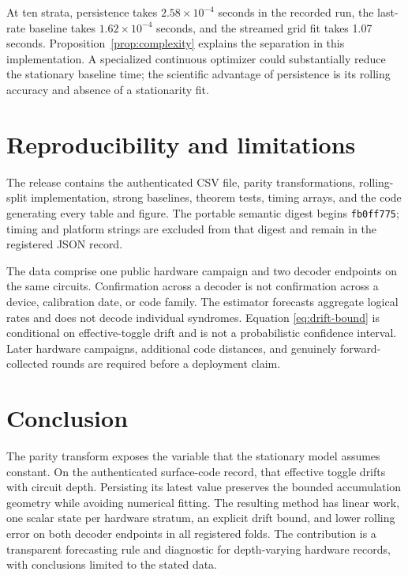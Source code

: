 \documentclass[10pt,letterpaper,twoside]{article}
\begin{document}
At ten strata, persistence takes $2.58\times10^{-4}$ seconds in the recorded
run, the last-rate baseline takes $1.62\times10^{-4}$ seconds, and the streamed
grid fit takes 1.07 seconds. Proposition~\ref{prop:complexity} explains the
separation in this implementation. A specialized continuous optimizer could
substantially reduce the stationary baseline time; the scientific advantage of
persistence is its rolling accuracy and absence of a stationarity fit.

\section{Reproducibility and limitations}

The release contains the authenticated CSV file, parity transformations,
rolling-split implementation, strong baselines, theorem tests, timing arrays,
and the code generating every table and figure. The portable semantic digest
begins \texttt{fb0ff775}; timing and platform strings are excluded from that
digest and remain in the registered JSON record.

The data comprise one public hardware campaign and two decoder endpoints on the
same circuits. Confirmation across a decoder is not confirmation across a
device, calibration date, or code family. The estimator forecasts aggregate
logical rates and does not decode individual syndromes. Equation
\eqref{eq:drift-bound} is conditional on effective-toggle drift and is not a
probabilistic confidence interval. Later hardware campaigns, additional code
distances, and genuinely forward-collected rounds are required before a
deployment claim.

\section{Conclusion}

The parity transform exposes the variable that the stationary model assumes
constant. On the authenticated surface-code record, that effective toggle
drifts with circuit depth. Persisting its latest value preserves the bounded
accumulation geometry while avoiding numerical fitting. The resulting method
has linear work, one scalar state per hardware stratum, an explicit drift
bound, and lower rolling error on both decoder endpoints in all registered
folds. The contribution is a transparent forecasting rule and diagnostic for
depth-varying hardware records, with conclusions limited to the stated data.
\end{document}
